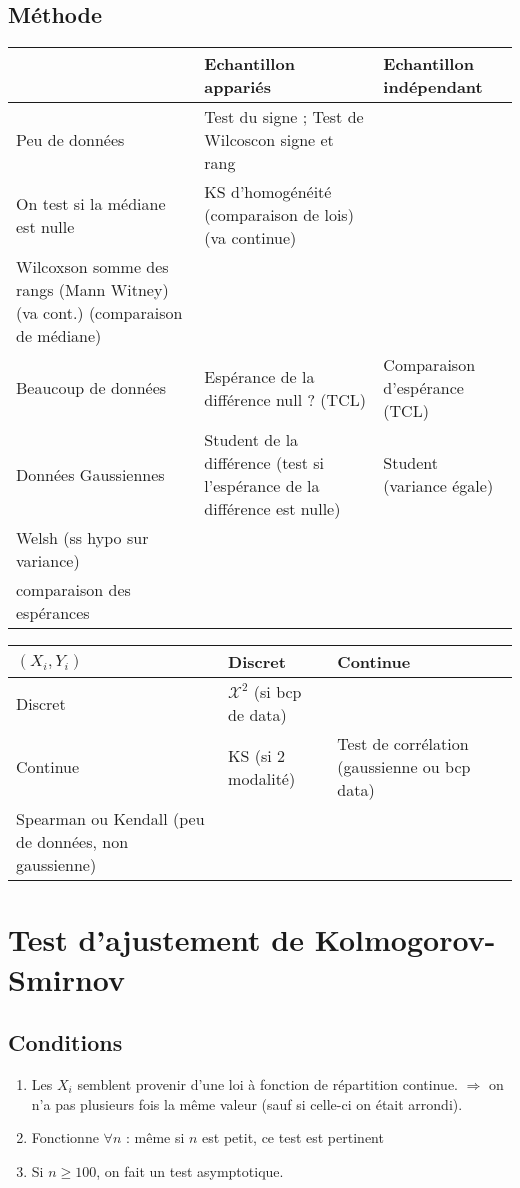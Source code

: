\documentclass{article}
\theoremstyle{plain}%
\theoremstyle{definition}
\theoremstyle{remark}
\begin{document}
\subsection*{Méthode}
\begin{table}[!ht]
    \centering
    \begin{tabular}{|l|l|l|}
    \hline
        ~ & Echantillon appariés & Echantillon indépendant \\ \hline
        Peu de données & Test du signe ; Test de Wilcoscon signe et rang \\ On test si la médiane est nulle & KS d'homogénéité (comparaison de lois) (va continue) \\ Wilcoxson somme des rangs (Mann Witney) (va cont.) (comparaison de médiane) \\ \hline
        Beaucoup de données & Espérance de la différence null ? (TCL) & Comparaison d'espérance (TCL) \\ \hline
        Données Gaussiennes & Student de la différence (test si l'espérance de la différence est nulle) & Student (variance égale) \\ Welsh (ss hypo sur variance) \\ comparaison des espérances  \\ \hline
    \end{tabular}
\end{table}
\begin{table}[!ht]
    \centering
    \begin{tabular}{|l|l|l|}
    \hline
        $ (X_i,Y_i) $  & Discret & Continue \\ \hline
        Discret & $\mathcal{X}^2$ (si bcp de data) & ~ \\ \hline
        Continue & KS (si 2 modalité) & Test de corrélation (gaussienne ou bcp data)\\ Spearman ou Kendall (peu de données, non gaussienne) \\ \hline
    \end{tabular}
\end{table}

\section{Test d'ajustement de Kolmogorov-Smirnov}


\subsection*{Conditions}
\begin{enumerate}
    \item Les $ X_i $ semblent provenir d'une loi à fonction de répartition continue. $ \Rightarrow  $ on n'a pas plusieurs fois la même valeur (sauf si celle-ci on était arrondi).
    \item Fonctionne $ \forall n $ : même si $ n $ est petit, ce test est pertinent
    \item Si $ n \geq 100 $, on fait un test asymptotique.
\end{enumerate}
\end{document}
